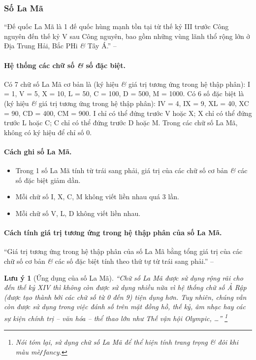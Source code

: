 \documentclass{article}
\numberwithin{equation}{section}
\newtheorem{remark}{Lưu ý}[section]
\begin{document}
\subsubsection{Số La Mã}
``Đế quốc La Mã là 1 đế quốc hùng mạnh tồn tại từ thế kỷ III trước Công nguyên đến thế kỷ V sau Công nguyên, bao gồm những vùng lãnh thổ rộng lớn ở Địa Trung Hải, Bắc PHi \textit{\&} Tây Á.'' -- \cite[p. 14]{Thai_Anh_Dat_Ha_Loan_Nam_Quang_Toan_6_tap_1}

\paragraph{Hệ thống các chữ số \textit{\&} số đặc biệt.} Có 7 chữ số La Mã cơ bản là (ký hiệu \textit{\&} giá trị tương ứng trong hệ thập phân): I = 1, V = 5, X = 10, L = 50, C = 100, D = 500, M = 1000. Có 6 số đặc biệt là (ký hiệu \textit{\&} giá trị tương ứng trong hệ thập phân): IV = 4, IX = 9, XL = 40, XC = 90, CD = 400, CM = 900. I chỉ có thể đứng trước V hoặc X; X chỉ có thể đứng trước L hoặc C; C chỉ có thể đứng trước D hoặc M. Trong các chữ số La Mã, không có ký hiệu để chỉ số 0.

\paragraph{Cách ghi số La Mã.}
\begin{itemize}
	\item Trong 1 số La Mã tính từ trái sang phải, giá trị của các chữ số cơ bản \textit{\&} các số đặc biệt giảm dần.
	\item Mỗi chữ số I, X, C, M không viết liền nhau quá 3 lần.
	\item Mỗi chữ số V, L, D không viết liền nhau.
\end{itemize}

\paragraph{Cách tính giá trị tương ứng trong hệ thập phân của số La Mã.} ``Giá trị tương ứng trong hệ thập phân của số La Mã bằng tổng giá trị của các chữ số cơ bản \textit{\&} các số đặc biệt tính theo thứ tự từ trái sang phải.'' -- \cite[p. 14]{Thai_Anh_Dat_Ha_Loan_Nam_Quang_Toan_6_tap_1}

\begin{remark}[Ứng dụng của số La Mã]
	``Chữ số La Mã được sử dụng rộng rãi cho đến thế kỷ XIV thì không còn được sử dụng nhiều nữa vì hệ thống chữ số Ả Rập (được tạo thành bởi các chữ số từ 0 đến 9) tiện dụng hơn. Tuy nhiên, chúng vẫn còn được sử dụng trong việc đánh số trên mặt đồng hồ, thế kỷ, âm nhạc hay các sự kiện chính trị -- văn hóa -- thể thao lớn như Thế vận hội Olympic, \ldots'' \footnote{Nói tóm lại, sử dụng chữ số La Mã để thể hiện tính trang trọng \textit{\&} đôi khi màu mè\texttt{/}fancy.}
\end{remark}
\end{document}
